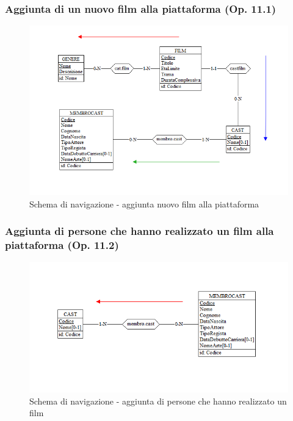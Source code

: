 \documentclass[a4paper,12pt]{report}
\begin{document}
	\subsubsection{Aggiunta di un nuovo film alla piattaforma (Op. 11.1)}
	\begin{figure}[H]
		\centering
		\includegraphics[width=450pt]{ER/navigazione/aggiuntafilm.png}
		\caption{Schema di navigazione - aggiunta nuovo film alla piattaforma}
	\end{figure}
	
	\subsubsection{Aggiunta di persone che hanno realizzato un film alla piattaforma (Op. 11.2)}
	\begin{figure}[H]
		\centering
		\includegraphics[width=450pt]{ER/navigazione/aggiuntacast.png}
		\caption{Schema di navigazione - aggiunta di persone che hanno realizzato un film}
	\end{figure}
	
\end{document}
